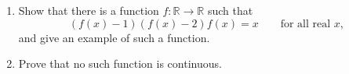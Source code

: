 \begin{enumerate}
\item[(a)] Show that there is a function $f:\mathbb R\to\mathbb R$ such that
\[\left(f(x)-1\right)\left(f(x)-2\right)f(x)=x\qquad\text{for all real }x,\]
and give an example of such a function.
\item[(b)] Prove that no such function is continuous.
\end{enumerate}
